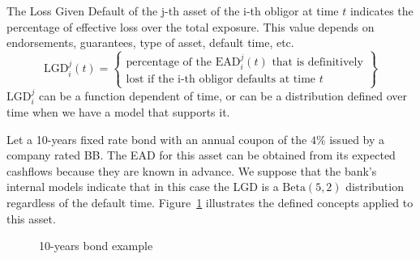 \documentclass[11pt,fleqn]{book} %
\begin{document}
\begin{definition}
	The Loss Given Default of the j-th asset of the i-th obligor at time $t$ 
	indicates the percentage of effective loss over the total exposure. This
	value depends on endorsements, guarantees, type of asset, default time, etc.
	\begin{displaymath}
		\text{LGD}_i^j(t) = \left\{
		\begin{array}{c}
			\text{percentage of the $\text{EAD}_i^j(t)$ that is definitively} \\
			\text{lost if the i-th obligor defaults at time $t$}
		\end{array}
		\right\}
	\end{displaymath}
	$\text{LGD}_i^j$ can be a function dependent of time, or can be a 
	distribution defined over time when we have a model that supports it. 
\end{definition}

\begin{example}
	Let a 10-years fixed rate bond with an annual coupon of the
	$4\%$ issued by a company rated BB\@.
	The EAD for this asset can be obtained from its expected cashflows 
	because they are known in advance. We suppose that the bank's
	internal models indicate that in this case the LGD is a 
	$\text{Beta}(5,2)$ distribution regardless of the default time.
	Figure~\ref{figure:bond} illustrates the defined concepts applied 
	to this asset.
	\begin{figure}[!ht]
		\centering
		\caption{10-years bond example}
		\label{figure:bond} 
	\end{figure}
\end{example}

\end{document}
